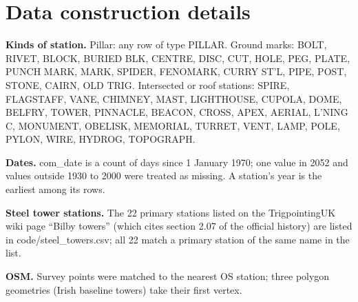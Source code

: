 \documentclass[11pt,a4paper]{article}
\begin{document}
\appendix
\section{Data construction details}\label{app:data}
{\raggedright\textbf{Kinds of station.} Pillar: any row of type PILLAR. Ground marks: BOLT, RIVET, BLOCK, BURIED BLK, CENTRE, DISC, CUT, HOLE, PEG, PLATE, PUNCH MARK, MARK, SPIDER, FENOMARK, CURRY ST'L, PIPE, POST, STONE, CAIRN, OLD TRIG. Intersected or roof stations: SPIRE, FLAGSTAFF, VANE, CHIMNEY, MAST, LIGHTHOUSE, CUPOLA, DOME, BELFRY, TOWER, PINNACLE, BEACON, CROSS, APEX, AERIAL, L'NING C, MONUMENT, OBELISK, MEMORIAL, TURRET, VENT, LAMP, POLE, PYLON, WIRE, HYDROG, TOPOGRAPH.\par}

\textbf{Dates.} com\_date is a count of days since 1 January 1970; one value in 2052 and values outside 1930 to 2000 were treated as missing. A station's year is the earliest among its rows.

\textbf{Steel tower stations.} The 22 primary stations listed on the TrigpointingUK wiki page ``Bilby towers'' (which cites section 2.07 of the official history) are listed in code/steel\_towers.csv; all 22 match a primary station of the same name in the list.

\textbf{OSM.} Survey points were matched to the nearest OS station; three polygon geometries (Irish baseline towers) take their first vertex.
\end{document}
